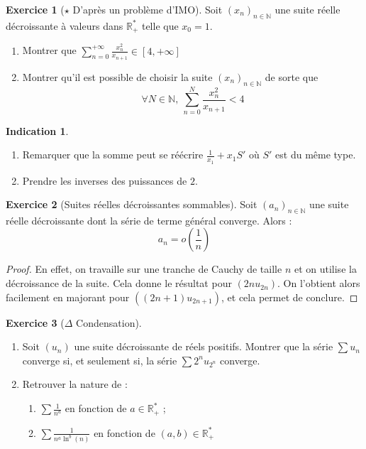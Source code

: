 \documentclass[french]{book}
\newcommand{\N}{\mathbb{N}}
\newcommand{\R}{\mathbb{R}}
\newcommand{\st}{^*}
\theoremstyle{definition}
\newtheorem{ex}{Exercice}[chapter]
\theoremstyle{theorem}
\newtheorem*{ind}{Indication}
\theoremstyle{remark}
\begin{document}
\begin{ex}[$\star$ D'après un problème d'IMO]
	Soit $(x_n)_{n\in\N}$ une suite réelle décroissante à valeurs dans $\R_+\st$ telle que $x_0=1$.
	\begin{enumerate}
		\item Montrer que $\displaystyle\sum_{n=0}^{+\infty}\frac{x_n^2}{x_{n+1}}\in[4,+\infty]$
		\item Montrer qu'il est possible de choisir la suite $(x_n)_{n\in\N}$ de sorte que $$\forall N\in\N,\ \sum_{n=0}^{N}\frac{x_n^2}{x_{n+1}}<4$$
	\end{enumerate}
\end{ex}

\begin{ind}
	\begin{enumerate}
		\item Remarquer que la somme peut se réécrire $\displaystyle\frac{1}{x_1}+x_1S'$ où $S'$ est du même type.
		\item Prendre les inverses des puissances de $2$.
	\end{enumerate}
\end{ind}

\begin{ex}[Suites réelles décroissantes sommables] Soit $(a_n)_{n\in\N}$ une suite réelle décroissante dont la série de terme général converge. Alors : $$a_n=o\left(\frac{1}{n}\right)$$
\end{ex}

\begin{proof}
	En effet, on travaille sur une tranche de Cauchy de taille $n$ et on utilise la décroissance de la suite. Cela donne le résultat pour $(2nu_{2n})$. On l'obtient alors facilement en majorant pour $((2n+1)u_{2n+1})$, et cela permet de conclure.
\end{proof}

\begin{ex}[$\Delta$ Condensation]
	\begin{enumerate}
		\item Soit $(u_n)$ une suite décroissante de réels positifs. Montrer que la série $\sum u_n$ converge si, et seulement si, la série $\sum 2^nu_{2^n}$ converge.
		\item Retrouver la nature de :
		\begin{enumerate}
			\item $\displaystyle\sum\frac{1}{n^a}$ en fonction de $a\in\R_+\st$ ;
			\item $\displaystyle\sum\frac{1}{n^a\ln^b(n)}$ en fonction de $(a,b)\in\R_+\st$
		\end{enumerate}
	\end{enumerate}
\end{ex}
\end{document}
